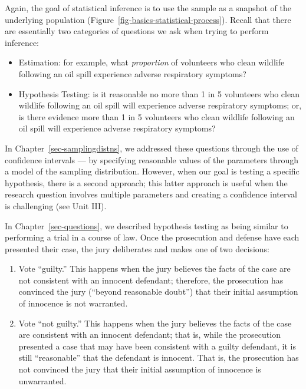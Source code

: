 \documentclass[
  letterpaper,
  DIV=11,
  numbers=noendperiod]{scrreprt}
\providecommand{\tightlist}{%
  \setlength{\itemsep}{0pt}\setlength{\parskip}{0pt}}\usepackage{longtable,booktabs,array}
\theoremstyle{definition}
\theoremstyle{definition}
\theoremstyle{plain}
\theoremstyle{remark}
\begin{document}
Again, the goal of statistical inference is to use the sample as a
snapshot of the underlying population
(Figure~\ref{fig-basics-statistical-process}). Recall that there are
essentially two categories of questions we ask when trying to perform
inference:

\begin{itemize}
\tightlist
\item
  Estimation: for example, what \emph{proportion} of volunteers who
  clean wildlife following an oil spill experience adverse respiratory
  symptoms?
\item
  Hypothesis Testing: is it reasonable no more than 1 in 5 volunteers
  who clean wildlife following an oil spill will experience adverse
  respiratory symptoms; or, is there evidence more than 1 in 5
  volunteers who clean wildlife following an oil spill will experience
  adverse respiratory symptoms?
\end{itemize}

In Chapter~\ref{sec-samplingdistns}, we addressed these questions
through the use of confidence intervals --- by specifying reasonable
values of the parameters through a model of the sampling distribution.
However, when our goal is testing a specific hypothesis, there is a
second approach; this latter approach is useful when the research
question involves multiple parameters and creating a confidence interval
is challenging (see Unit III).

In Chapter~\ref{sec-questions}, we described hypothesis testing as being
similar to performing a trial in a course of law. Once the prosecution
and defense have each presented their case, the jury deliberates and
makes one of two decisions:

\begin{enumerate}
\def\labelenumi{\arabic{enumi}.}
\tightlist
\item
  Vote ``guilty.'' This happens when the jury believes the facts of the
  case are not consistent with an innocent defendant; therefore, the
  prosecution has convinced the jury (``beyond reasonable doubt'') that
  their initial assumption of innocence is not warranted.
\item
  Vote ``not guilty.'' This happens when the jury believes the facts of
  the case are consistent with an innocent defendant; that is, while the
  prosecution presented a case that may have been consistent with a
  guilty defendant, it is still ``reasonable'' that the defendant is
  innocent. That is, the prosecution has not convinced the jury that
  their initial assumption of innocence is unwarranted.
\end{enumerate}
\end{document}
